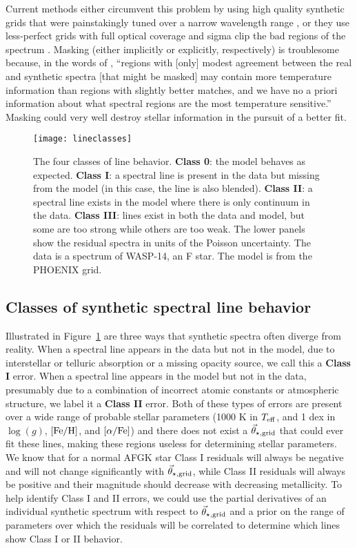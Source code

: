 \documentclass[preprint]{aastex} %
\newcommand{\vt}{\vec{\theta}}
\newcommand{\vg}{\vt_{\star, {\rm grid}}}
\newcommand{\Z}{[{\rm Fe}/{\rm H}]}
\newcommand{\A}{[\alpha/{\rm Fe}]}
\begin{document}
Current methods either circumvent this problem by using high quality synthetic grids that were painstakingly tuned over a narrow wavelength range \citep[$\lesssim 500$ \AA]{blj+12,sb13}, or they use less-perfect grids with full optical coverage and sigma clip the bad regions of the spectrum \citep{kpb+09,mga13}. Masking (either implicitly or explicitly, respectively) is troublesome because, in the words of \citet{mga13}, ``regions with [only] modest agreement between the real and synthetic spectra [that might be masked] may contain more temperature information than regions with slightly better matches, and we have no a priori information about what spectral regions are the most temperature sensitive.'' Masking could very well destroy stellar information in the pursuit of a better fit. 

\begin{figure}[!htb]
\begin{center}
\texttt{[image: lineclasses]}
\caption{The four classes of line behavior. \textbf{Class 0}: the model behaves as expected. \textbf{Class I}: a spectral line is present in the data but missing from the model (in this case, the line is also blended). \textbf{Class II}: a spectral line exists in the model where there is only continuum in the data. \textbf{Class III}: lines exist in both the data and model, but some are too strong while others are too weak. The lower panels show the residual spectra in units of the Poisson uncertainty. The data is a spectrum of WASP-14, an F star. The model is from the PHOENIX grid\citep{hwd+13}.}
\label{fig:lineclasses}
\end{center}
\end{figure}

\subsection{Classes of synthetic spectral line behavior}
Illustrated in Figure~\ref{fig:lineclasses} are three ways that synthetic spectra often diverge from reality. When a spectral line appears in the data but not in the model, due to interstellar or telluric absorption or a missing opacity source, we call this a \textbf{Class I} error. When a spectral line appears in the model but not in the data, presumably due to a combination of incorrect atomic constants or atmospheric structure, we label it a \textbf{Class II} error. Both of these types of errors are present over a wide range of probable stellar parameters (1000 K in $T_{\rm eff}$, and 1 dex in $\log(g)$, $\Z$, and $\A$) and there does not exist a $\vg$ that could ever fit these lines, making these regions useless for determining stellar parameters. We know that for a normal AFGK star Class I residuals will always be negative and will not change significantly with $\vg$, while Class II residuals will always be positive and their magnitude should decrease with decreasing metallicity. To help identify Class I and II errors,  we could use the partial derivatives of an individual synthetic spectrum with respect to $\vg$ and a prior on the range of parameters over which the residuals will be correlated to determine which lines show Class I or II behavior.
\end{document}
